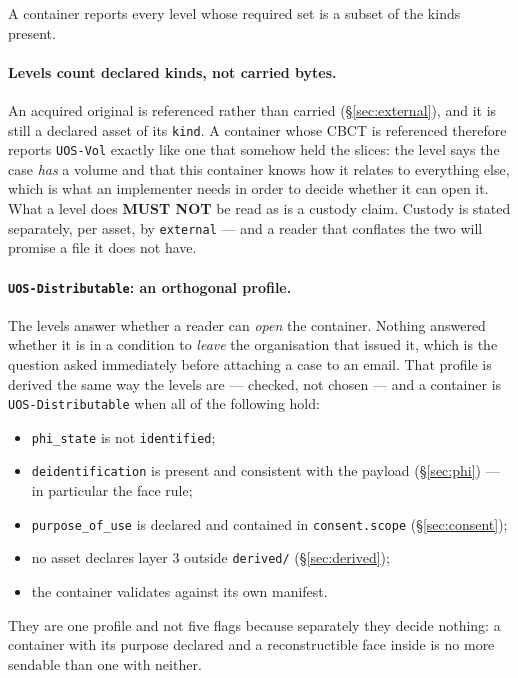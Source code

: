 \documentclass[11pt,a4paper]{article}
\newcommand{\MUSTNOT}{\textcolor{uosred}{\textbf{MUST NOT}}}
\newcommand{\code}[1]{\texttt{\small #1}}
\begin{document}
A container reports every level whose required set is a subset of the kinds present.

\paragraph{Levels count declared kinds, not carried bytes.}
An acquired original is referenced rather than carried (\S\ref{sec:external}), and it is
still a declared asset of its \code{kind}. A container whose CBCT is referenced therefore
reports \code{UOS-Vol} exactly like one that somehow held the slices: the level says the
case \emph{has} a volume and that this container knows how it relates to everything else,
which is what an implementer needs in order to decide whether it can open it. What a level does \MUSTNOT{} be read as is a custody claim. Custody is stated separately,
per asset, by \code{external} --- and a reader that conflates the two will promise a file
it does not have.

\paragraph{\code{UOS-Distributable}: an orthogonal profile.}
The levels answer whether a reader can \emph{open} the container. Nothing answered whether
it is in a condition to \emph{leave} the organisation that issued it, which is the question
asked immediately before attaching a case to an email. That profile is derived the same way
the levels are --- checked, not chosen --- and a container is \code{UOS-Distributable} when
all of the following hold:

\begin{itemize}
  \item \code{phi\_state} is not \code{identified};
  \item \code{deidentification} is present and consistent with the payload
  (\S\ref{sec:phi}) --- in particular the face rule;
  \item \code{purpose\_of\_use} is declared and contained in \code{consent.scope}
  (\S\ref{sec:consent});
  \item no asset declares layer 3 outside \code{derived/} (\S\ref{sec:derived});
  \item the container validates against its own manifest.
\end{itemize}

They are one profile and not five flags because separately they decide nothing: a container
with its purpose declared and a reconstructible face inside is no more sendable than one
with neither.
\end{document}
